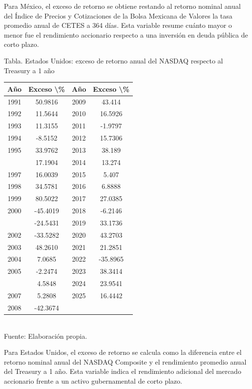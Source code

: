 \documentclass{article}\usepackage[]{graphicx}\usepackage[]{xcolor}
\begin{document}
Para México, el exceso de retorno se obtiene restando al retorno nominal anual del Índice de Precios y Cotizaciones de la Bolsa Mexicana de Valores la tasa promedio anual de CETES a 364 días. Esta variable resume cuánto mayor o menor fue el rendimiento accionario respecto a una inversión en deuda pública de corto plazo.

\begin{center}
Tabla. Estados Unidos: exceso de retorno anual del NASDAQ respecto al Treasury a 1 año
\end{center}
\begin{center}

\begin{tabular}{cccc}
\toprule
Año & Exceso \textbackslash{}\% & Año & Exceso \textbackslash{}\%\\
\midrule
1991 & 50.9816 & 2009 & 43.414\\
1992 & 11.5644 & 2010 & 16.5926\\
1993 & 11.3155 & 2011 & -1.9797\\
1994 & -8.5152 & 2012 & 15.7306\\
1995 & 33.9762 & 2013 & 38.189\\
\addlinespace
1996 & 17.1904 & 2014 & 13.274\\
1997 & 16.0039 & 2015 & 5.407\\
1998 & 34.5781 & 2016 & 6.8888\\
1999 & 80.5022 & 2017 & 27.0385\\
2000 & -45.4019 & 2018 & -6.2146\\
\addlinespace
2001 & -24.5431 & 2019 & 33.1736\\
2002 & -33.5282 & 2020 & 43.2703\\
2003 & 48.2610 & 2021 & 21.2851\\
2004 & 7.0685 & 2022 & -35.8965\\
2005 & -2.2474 & 2023 & 38.3414\\
\addlinespace
2006 & 4.5848 & 2024 & 23.9541\\
2007 & 5.2808 & 2025 & 16.4442\\
2008 & -42.3674 &  & \\
\bottomrule
\end{tabular}
\\[0.3em]
{\footnotesize Fuente: Elaboración propia.}
\end{center}


Para Estados Unidos, el exceso de retorno se calcula como la diferencia entre el retorno nominal anual del NASDAQ Composite y el rendimiento promedio anual del Treasury a 1 año. Esta variable indica el rendimiento adicional del mercado accionario frente a un activo gubernamental de corto plazo.
\end{document}
